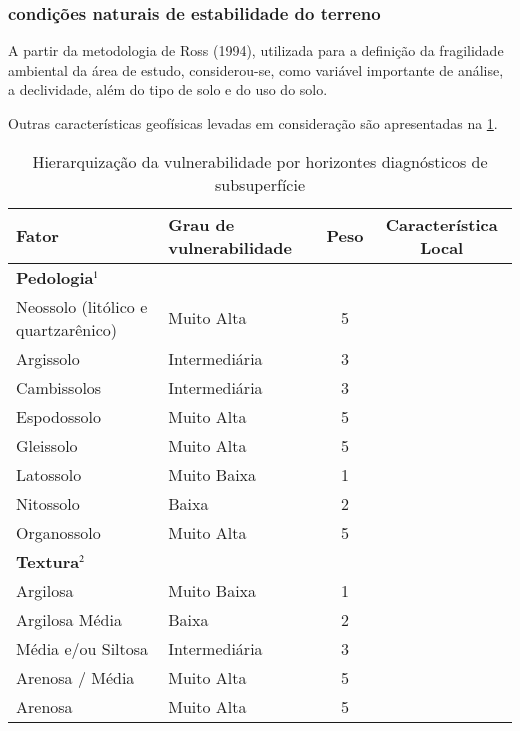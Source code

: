 \subsubsection{condições naturais de estabilidade do terreno}

A partir da metodologia de Ross (1994), utilizada para a
definição da fragilidade ambiental da área de estudo,
considerou-se, como variável importante de análise,
a declividade, além do tipo de solo e do uso do solo.

Outras características geofísicas levadas em consideração
são apresentadas na \cref{tab:estab}.

\begin{table}[htb!]
	\centering
	\caption{Hierarquização da vulnerabilidade por horizontes diagnósticos
		de subsuperfície}
	\label{tab:estab}
	\begin{tabularx}{\textwidth}{@{\hspace{1cm}}Xlcc}	
		\toprule
		\bfseries Fator & 
		\bfseries Grau de vulnerabilidade &
		\bfseries Peso&
		\multicolumn{1}{c}{\bfseries Característica Local} \\
		\midrule
		\multicolumn{3}{l}{\bfseries Pedologia$\footnotesize^1$}\\\cmidrule{1-1}
		Neossolo  (litólico e quartzarênico) & Muito Alta & 5 & \Square\\
		Argissolo   & Intermediária&3 & \Square\\
		Cambissolos & Intermediária &3& \Square\\
		Espodossolo & Muito Alta &5& \Square\\
		Gleissolo   & Muito Alta &5& \Square\\
		Latossolo   & Muito Baixa &1& \Square\\
		Nitossolo   & Baixa &2& \CheckedBox\\
		Organossolo & Muito Alta &5& \Square\\
		
		\multicolumn{3}{l}{\bfseries Textura$\footnotesize^2$}\\\cmidrule{1-1}
		Argilosa & Muito Baixa  &  1& \CheckedBox\\
		Argilosa Média & Baixa  & 2& \Square\\
		Média e/ou Siltosa & Intermediária  & 3& \Square\\
		Arenosa / Média  &  Muito Alta & 5& \Square\\
		Arenosa  & Muito Alta  & 5& \Square\\
		

\end{tabularx}
\end{table}
